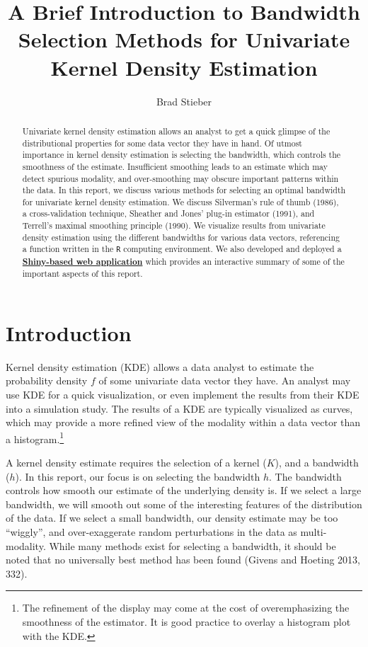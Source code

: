 \documentclass[]{article}
\title{A Brief Introduction to Bandwidth Selection Methods for Univariate
Kernel Density Estimation}
\author{Brad Stieber}
\date{}
\let\rmarkdownfootnote\footnote%
\def\footnote{\protect\rmarkdownfootnote}
\begin{document}
\maketitle
\begin{abstract}
Univariate kernel density estimation allows an analyst to get a quick
glimpse of the distributional properties for some data vector they have
in hand. Of utmost importance in kernel density estimation is selecting
the bandwidth, which controls the smoothness of the estimate.
Insufficient smoothing leads to an estimate which may detect spurious
modality, and over-smoothing may obscure important patterns within the
data. In this report, we discuss various methods for selecting an
optimal bandwidth for univariate kernel density estimation. We discuss
Silverman's rule of thumb (1986), a cross-validation technique, Sheather
and Jones' plug-in estimator (1991), and Terrell's maximal smoothing
principle (1990). We visualize results from univariate density
estimation using the different bandwidths for various data vectors,
referencing a function written in the \texttt{R} computing environment.
We also developed and deployed a
\textbf{\href{http://www.statlab.wisc.edu/shiny/Bandwidths_For_UnivariateKDE/}{Shiny-based
web application}} which provides an interactive summary of some of the
important aspects of this report.
\end{abstract}

\section{Introduction}\label{introduction}

Kernel density estimation (KDE) allows a data analyst to estimate the
probability density \(f\) of some univariate data vector they have. An
analyst may use KDE for a quick visualization, or even implement the
results from their KDE into a simulation study. The results of a KDE are
typically visualized as curves, which may provide a more refined view of
the modality within a data vector than a histogram.\footnote{The
  refinement of the display may come at the cost of overemphasizing the
  smoothness of the estimator. It is good practice to overlay a
  histogram plot with the KDE.}

A kernel density estimate requires the selection of a kernel (\(K\)),
and a bandwidth (\(h\)). In this report, our focus is on selecting the
bandwidth \(h\). The bandwidth controls how smooth our estimate of the
underlying density is. If we select a large bandwidth, we will smooth
out some of the interesting features of the distribution of the data. If
we select a small bandwidth, our density estimate may be too ``wiggly'',
and over-exaggerate random perturbations in the data as multi-modality.
While many methods exist for selecting a bandwidth, it should be noted
that no universally best method has been found (Givens and Hoeting 2013,
332).
\end{document}
